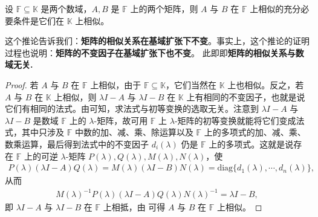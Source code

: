 \documentclass[../../main.tex]{subfiles}
\begin{document}
\begin{corollary}\label{corollary:矩阵的相似关系在基域扩张下不变}
设 $\mathbb{F}\subseteq\mathbb{K}$ 是两个数域，$A, B$ 是 $\mathbb{F}$ 上的两个矩阵，则 $A$ 与 $B$ 在 $\mathbb{F}$ 上相似的充分必要条件是它们在 $\mathbb{K}$ 上相似。
\end{corollary}
\begin{note}
这个推论告诉我们：\textbf{矩阵的相似关系在基域扩张下不变}。事实上，这个推论的证明过程也说明：\textbf{矩阵的不变因子在基域扩张下也不变}。 此即即\textbf{矩阵的相似关系与数域无关.}
\end{note}
\begin{proof}
若 $A$ 与 $B$ 在 $\mathbb{F}$ 上相似，由于 $\mathbb{F}\subseteq\mathbb{K}$，它们当然在 $\mathbb{K}$ 上也相似。反之，若 $A$ 与 $B$ 在 $\mathbb{K}$ 上相似，则 $\lambda I - A$ 与 $\lambda I - B$ 在 $\mathbb{K}$ 上有相同的不变因子，也就是说它们有相同的法式。由可知，求法式与初等变换的选取无关。注意到 $\lambda I - A$ 与 $\lambda I - B$ 是数域 $\mathbb{F}$ 上的 $\lambda$-矩阵，故可用 $\mathbb{F}$ 上 $\lambda$-矩阵的初等变换就能将它们变成法式，其中只涉及 $\mathbb{F}$ 中数的加、减、乘、除运算以及 $\mathbb{F}$ 上的多项式的加、减、乘、数乘运算，最后得到法式中的不变因子 $d_i(\lambda)$ 仍是 $\mathbb{F}$ 上的多项式。这就是说存在 $\mathbb{F}$ 上的可逆 $\lambda$-矩阵 $P(\lambda), Q(\lambda), M(\lambda), N(\lambda)$，使
\begin{align*}
P(\lambda)(\lambda I - A)Q(\lambda)=M(\lambda)(\lambda I - B)N(\lambda)=\mathrm{diag}\{d_1(\lambda),\cdots,d_n(\lambda)\},
\end{align*}
从而
\begin{align*}
M(\lambda)^{-1}P(\lambda)(\lambda I - A)Q(\lambda)N(\lambda)^{-1}=\lambda I - B,
\end{align*}
即 $\lambda I - A$ 与 $\lambda I - B$ 在 $\mathbb{F}$ 上相抵，由 可得 $A$ 与 $B$ 在 $\mathbb{F}$ 上相似。
\end{proof}
\end{document}
